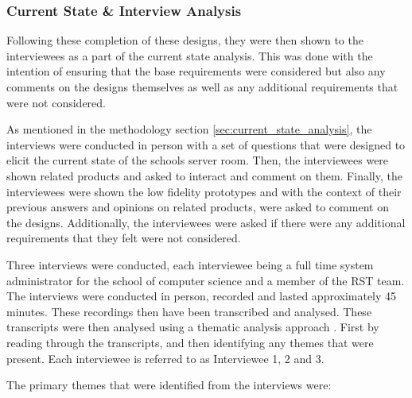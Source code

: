 \documentclass [11pt,a4paper]{article}
\begin{document}
\subsubsection{Current State \& Interview Analysis}
\label{sec:ui_design_interview_analysis}
Following these completion of these designs, they were then shown to the interviewees as a part of the current state analysis. This was done with the intention of ensuring that the base requirements were considered but also any comments on the designs themselves as well as any additional requirements that were not considered. 

As mentioned in the methodology section \ref{sec:current_state_analysis}, the interviews were conducted in person with a set of questions that were designed to elicit the current state of the schools server room. Then, the interviewees were shown related products and asked to interact and comment on them. Finally, the interviewees were shown the low fidelity prototypes and with the context of their previous answers and opinions on related products, were asked to comment on the designs. Additionally, the interviewees were asked if there were any additional requirements that they felt were not considered.

Three interviews were conducted, each interviewee being a full time system administrator for the school of computer science and a member of the RST team. The interviews were conducted in person, recorded and lasted approximately 45 minutes. These recordings then have been transcribed and analysed. These transcripts were then analysed using a thematic analysis approach \cite{thematicAnal}. First by reading through the transcripts, and then identifying any themes that were present. Each interviewee is referred to as Interviewee 1, 2 and 3. 

The primary themes that were identified from the interviews were:
\end{document}
